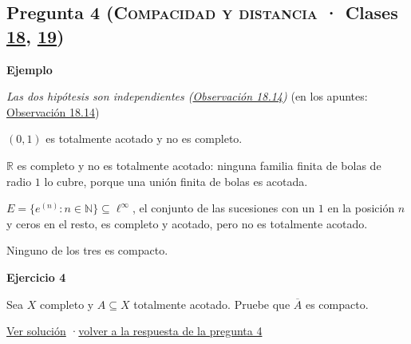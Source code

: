 \documentclass[11pt,a4paper]{article}
\newcommand{\R}{\mathbb{R}}\newcommand{\N}{\mathbb{N}}\newcommand{\Q}{\mathbb{Q}}
\newcommand{\cl}[1]{\overline{#1}}\newcommand{\norm}[1]{\lVert #1\rVert}\newcommand{\abs}[1]{\lvert #1\rvert}
\newcommand{\bloque}[1]{\par\smallskip\noindent\textbf{\color{acento}#1}\par}
\begin{document}
\subsection*{\hypertarget{e-4}{}Pregunta 4 \normalfont\small(\textsc{Compacidad y distancia} · Clases \href{https://decostruttivismo.github.io/MAT2514-repaso/pdf/MAT2514_apuntes_completos.pdf\#nameddest=section.18}{18}, \href{https://decostruttivismo.github.io/MAT2514-repaso/pdf/MAT2514_apuntes_completos.pdf\#nameddest=section.19}{19})}
\bloque{Ejemplo}
\textit{Las dos hipótesis son independientes (\href{https://decostruttivismo.github.io/MAT2514-repaso/pdf/MAT2514_apuntes_completos.pdf\#nameddest=teorema.18.14}{Observación 18.14})} {\small(en los apuntes: \href{https://decostruttivismo.github.io/MAT2514-repaso/pdf/MAT2514_apuntes_completos.pdf\#nameddest=teorema.18.14}{Observación 18.14})}
\begin{pasos}
\item[] $(0,1)$ es totalmente acotado y no es completo.
\item[] $\R$ es completo y no es totalmente acotado: ninguna familia finita de bolas de radio $1$ lo cubre, porque una unión finita de bolas es acotada.
\item[] $E=\{e^{(n)}:n\in\N\}\subseteq\ell^\infty$, el conjunto de las sucesiones con un $1$ en la posición $n$ y ceros en el resto, es completo y acotado, pero no es totalmente acotado.
\item[] Ninguno de los tres es compacto.
\end{pasos}
\bloque{\hypertarget{x-4}{}Ejercicio 4}
Sea $X$ completo y $A\subseteq X$ totalmente acotado. Pruebe que $\cl A$ es compacto.
\par{\small \hyperlink{s-4}{Ver solución} \quad·\quad \hyperlink{r-4}{volver a la respuesta de la pregunta 4}}
\end{document}
